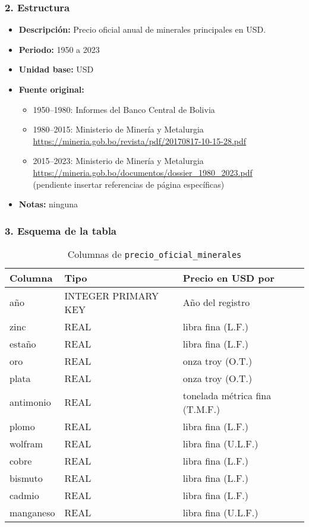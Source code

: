 \documentclass[12pt,a4paper]{article}
\begin{document}
\subsubsection*{2. Estructura}
\begin{itemize}
  \item \textbf{Descripción:} Precio oficial anual de minerales principales en USD.
  \item \textbf{Periodo:} 1950 a 2023
  \item \textbf{Unidad base:} USD
  \item \textbf{Fuente original:}
    \begin{itemize}
      \item 1950–1980: Informes del Banco Central de Bolivia
      \item 1980–2015: Ministerio de Minería y Metalurgia\\
        \url{https://mineria.gob.bo/revista/pdf/20170817-10-15-28.pdf}
      \item 2015–2023: Ministerio de Minería y Metalurgia\\
        \url{https://mineria.gob.bo/documentos/dossier_1980_2023.pdf}\\
        \small{(pendiente insertar referencias de página específicas)}
    \end{itemize}
  \item \textbf{Notas:} ninguna
\end{itemize}

\subsubsection*{3. Esquema de la tabla}
\begin{longtable}{@{}lll@{}}
\caption{Columnas de \texttt{precio\_oficial\_minerales}}\\
\toprule
\textbf{Columna} & \textbf{Tipo} & \textbf{Precio en USD por}\\
\midrule
año       & INTEGER PRIMARY KEY & Año del registro \\
zinc      & REAL                & libra fina (L.F.) \\
estaño    & REAL                & libra fina (L.F.) \\
oro       & REAL                & onza troy (O.T.) \\
plata     & REAL                & onza troy (O.T.) \\
antimonio & REAL                & tonelada métrica fina (T.M.F.) \\
plomo     & REAL                & libra fina (L.F.) \\
wolfram   & REAL                & libra fina (U.L.F.) \\
cobre     & REAL                & libra fina (L.F.) \\
bismuto   & REAL                & libra fina (L.F.) \\
cadmio    & REAL                & libra fina (L.F.) \\
manganeso & REAL                & libra fina (U.L.F.) \\
\bottomrule
\end{longtable}
\end{document}
